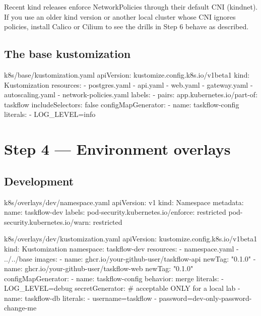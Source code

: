 \begin{deepdive}
Recent kind releases enforce NetworkPolicies through their default CNI
(kindnet). If you use an older kind version or another local cluster whose CNI
ignores policies, install Calico or Cilium to see the drills in Step 6 behave
as described.
\end{deepdive}

\subsection{The base kustomization}

\begin{yamlcode}{k8s/base/kustomization.yaml}
apiVersion: kustomize.config.k8s.io/v1beta1
kind: Kustomization
resources:
  - postgres.yaml
  - api.yaml
  - web.yaml
  - gateway.yaml
  - autoscaling.yaml
  - network-policies.yaml
labels:
  - pairs:
      app.kubernetes.io/part-of: taskflow
    includeSelectors: false
configMapGenerator:
  - name: taskflow-config
    literals:
      - LOG_LEVEL=info
\end{yamlcode}

\section{Step 4 --- Environment overlays}

\subsection{Development}

\begin{yamlcode}{k8s/overlays/dev/namespace.yaml}
apiVersion: v1
kind: Namespace
metadata:
  name: taskflow-dev
  labels:
    pod-security.kubernetes.io/enforce: restricted
    pod-security.kubernetes.io/warn: restricted
\end{yamlcode}

\begin{yamlcode}{k8s/overlays/dev/kustomization.yaml}
apiVersion: kustomize.config.k8s.io/v1beta1
kind: Kustomization
namespace: taskflow-dev
resources:
  - namespace.yaml
  - ../../base
images:
  - name: ghcr.io/your-github-user/taskflow-api
    newTag: "0.1.0"
  - name: ghcr.io/your-github-user/taskflow-web
    newTag: "0.1.0"
configMapGenerator:
  - name: taskflow-config
    behavior: merge
    literals:
      - LOG_LEVEL=debug
secretGenerator:                       # acceptable ONLY for a local lab
  - name: taskflow-db
    literals:
      - username=taskflow
      - password=dev-only-password-change-me
\end{yamlcode}

